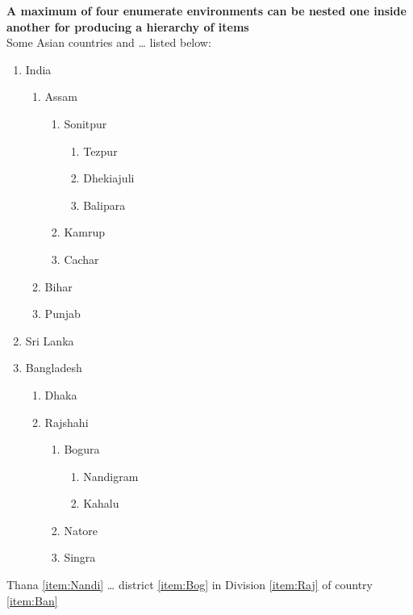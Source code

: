 \documentclass[11pt,a4paper]{article}
\begin{document}
{\Large\bf A maximum of four enumerate environments can be nested one inside another for producing a hierarchy of items}\\[10mm]
    Some Asian countries and … listed below:
    \setlength{\itemsep}{100mm}
    \begin{enumerate}
        \item India
        \begin{enumerate}
            \item Assam
            \begin{enumerate}
                \item Sonitpur
                \begin{enumerate}
                    \item Tezpur
                    \item Dhekiajuli
                    \item Balipara
                \end{enumerate}
                \item Kamrup
                \item Cachar
            \end{enumerate}
            \item Bihar
            \item Punjab
        \end{enumerate}

        \item Sri Lanka
        \item Bangladesh\label{item:Ban}
        \begin{enumerate}
            \item Dhaka
            \item Rajshahi\label{item:Raj}
            \begin{enumerate}
                \item Bogura\label{item:Bog}
                \begin{enumerate}
                    \item Nandigram\label{item:Nandi}
                    \item Kahalu
                \end{enumerate}
                \item Natore
                \item Singra
            \end{enumerate}
        \end{enumerate}
    \end{enumerate}
    Thana \ref{item:Nandi} … district \ref{item:Bog} in
    Division \ref{item:Raj} of country \ref{item:Ban}
\end{document}
